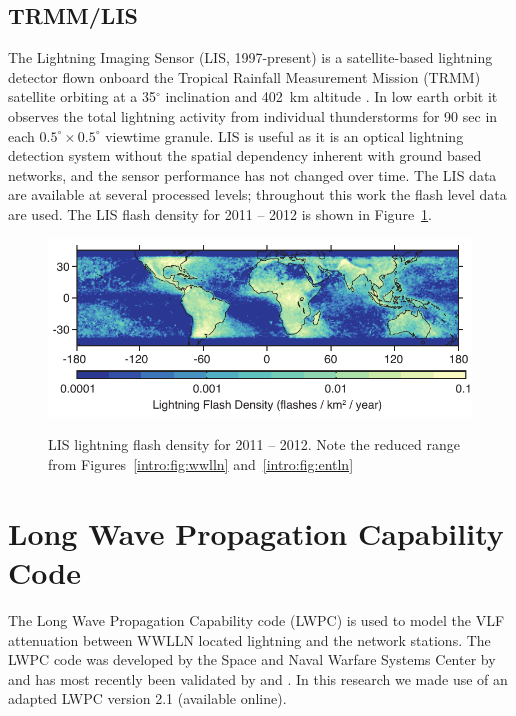 \subsection{TRMM/LIS}

The Lightning Imaging Sensor (LIS, 1997-present) is a satellite-based lightning detector flown onboard the Tropical Rainfall Measurement Mission (TRMM) satellite orbiting at a 35$^\circ$ inclination and 402~km altitude \citep{Christian1999}.
In low earth orbit it observes the total lightning activity from individual thunderstorms for 90 sec in each $0.5^\circ \times 0.5^\circ$ viewtime granule.
LIS is useful as it is an optical lightning detection system without the spatial dependency inherent with ground based networks, and the sensor performance has not changed over time.
The LIS data are available at several processed levels; throughout this work the flash level data are used.
The LIS flash density for 2011 -- 2012 is shown in Figure~\ref{intro:fig:lis}.

\begin{figure}[ht!]
	\centering
	\includegraphics[scale=1]{Introduction/Figures/lis_density.pdf}\\
	\caption{LIS lightning flash density for 2011 -- 2012.
		     Note the reduced range from Figures~\ref{intro:fig:wwlln} and~\ref{intro:fig:entln}}
	\label{intro:fig:lis}
\end{figure}

\section{Long Wave Propagation Capability Code}
\label{intro:sec:lwpc}

The Long Wave Propagation Capability code (LWPC) is used to model the VLF attenuation between WWLLN located lightning and the network stations.
The LWPC code was developed by the Space and Naval Warfare Systems Center by \citet{Ferguson1998} and has most recently been validated by \citet{McRae2000d} and \citet{Thomson2011}.
In this research we made use of an adapted LWPC version 2.1 (available online).

